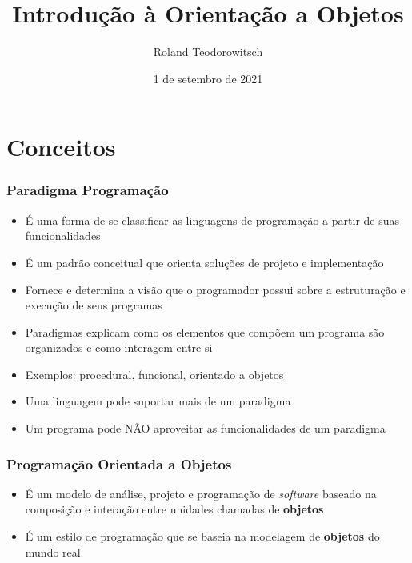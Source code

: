 \documentclass[aspectratio=169]{beamer}
\title[\sc{Introdução à Orientação a Objetos}]{Introdução à Orientação a Objetos}
\author[Roland Teodorowitsch]{Roland Teodorowitsch}
\institute[POO - EC - PUCRS]{Programação Orientada a Objetos - ECo - Curso de Engenharia de Computação - PUCRS}
\date{1 de setembro de 2021}
\begin{document}
\justifying

\begin{frame}
	\titlepage
\end{frame}

\section{Conceitos}

\begin{frame}\frametitle{Paradigma Programação}
\begin{itemize}
	\item É uma forma de se classificar as linguagens de programação a partir de suas funcionalidades
	\item É um padrão conceitual que orienta soluções de projeto e implementação
	\item Fornece e determina a visão que o programador possui sobre a estruturação e execução de seus programas
	\item Paradigmas explicam como os elementos que compõem um programa são organizados e como interagem entre si
	\item Exemplos: procedural, funcional, orientado a objetos
	\item Uma linguagem pode suportar mais de um paradigma
	\item Um programa pode NÃO aproveitar as funcionalidades de um paradigma
\end{itemize}
\end{frame}

\begin{frame}\frametitle{Programação Orientada a Objetos}
\begin{itemize}
	\item É um modelo de análise, projeto e programação de \emph{software} baseado na composição e interação entre unidades chamadas de \textbf{objetos}
	\item É um estilo de programação que se baseia na modelagem de \textbf{objetos} do mundo real
\end{itemize}
\end{frame}
\end{document}
